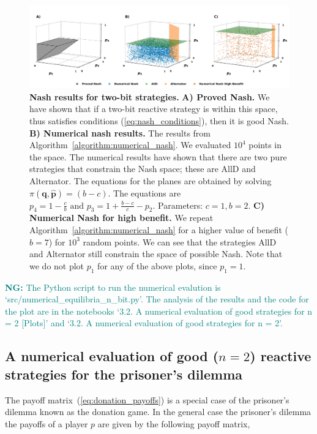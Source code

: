 \documentclass{article}
\theoremstyle{definition}
\newcommand{\nikoleta}[1]{\textcolor{teal}{{\bf NG:} #1}}
\begin{document}
\begin{figure}[!htbp]
     \centering
     \includegraphics[width=\textwidth]{static/two_bit_reactive_numerical_results.pdf}
     \caption{\textbf{Nash results for two-bit strategies.}
     \textbf{A) Proved Nash.} We have shown that if a two-bit reactive
     strategy is within this space, thus satisfies conditions
     (\ref{eq:nash_conditions}), then it is good Nash. \textbf{B) Numerical nash
     results.} The results from
     Algorithm~\ref{algorithm:numerical_nash}. We evaluated \(10 ^ 4\) points in
     the space. The numerical results have shown that there are two pure
     strategies that constrain the Nash space; these are AllD and Alternator.
     The equations for the planes are obtained by solving
     \(\pi(\mathbf{q}, \mathbf{\hat{p}}) = (b - c)\). The equations are
     \(p_4 = 1 - \frac{c}{b} \text{ and }  p_3 = 1 + \frac{b - c}{c} - p_2\).
      Parameters: \(c=1, b=2\). \textbf{C) Numerical Nash for high benefit.} We repeat
     Algorithm~\ref{algorithm:numerical_nash} for a higher value of benefit
     (\(b=7\)) for \(10 ^ 3\) random points. We can see that the strategies AllD
     and Alternator still constrain the space of possible Nash. Note that we do
     not plot \(p_1\) for any of the above plots, since \(p_1=1\).}\label{fig:two_bit_reactive_nash_results}
\end{figure}

\nikoleta{The Python script to run the numerical evalution is
`src/numerical\_equilibria\_n\_bit.py'. The analysis of the results and the code
for the plot are in the notebooks `3.2. A numerical evaluation of good
strategies for n = 2 [Plots]' and `3.2. A numerical evaluation of good
strategies for n = 2'.}

\subsection{A numerical evaluation of good (\(n=2\)) reactive strategies for the prisoner's dilemma}\label{section:good_strategies_numerically_pd}

The payoff matrix~(\ref{eq:donation_payoffs}) is a special case of the
prisoner's dilemma known as the donation game. In the general case the
prisoner's dilemma the payoffs of a player \(p\) are given by the following
payoff matrix,
\end{document}
